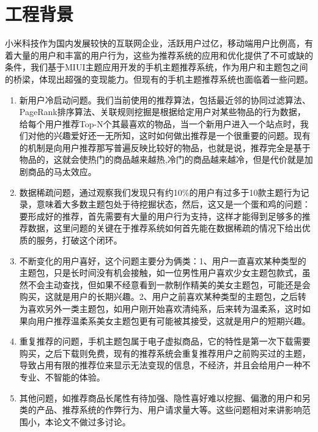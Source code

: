 \section{工程背景}
	小米科技作为国内发展较快的互联网企业，活跃用户过亿，移动端用户比例高，有着大量的用户和丰富的用户行为，这些为推荐系统的应用和优化提供了不可或缺的条件，我们基于MIUI主题应用开发的手机主题推荐系统，作为用户和主题包之间的桥梁，体现出超强的变现能力。但现有的手机主题推荐系统也面临着一些问题。
	\begin{enumerate}[(1)]
	\item 新用户冷启动问题。我们当前使用的推荐算法，包括最近邻的协同过滤算法、PageRank排序算法、关联规则挖掘是根据给定用户对某些物品的行为数据，给每个用户推荐Top-N个其最喜欢的物品，当一个新用户进入一个站点时，我们对他的兴趣爱好还一无所知，这时如何做出推荐是一个很重要的问题。现有的机制是向用户推荐那写普遍反映比较好的物品，也就是说，推荐完全是基于物品的，这就会使热门的商品越来越热,冷门的商品越来越冷，但是代价就是加剧商品的马太效应。

	\item 数据稀疏问题，通过观察我们发现只有约10\%的用户有过多于10款主题行为记录，意味着大多数主题包处于待挖掘状态，然后，这又是一个蛋和鸡的问题：要形成好的推荐，首先需要有大量的用户行为支持，这样才能得到足够多的推荐数据，这里问题的关键在于推荐系统如何首先能在数据稀疏的情况下给出优质的服务，打破这个闭环。

	\item 不断变化的用户喜好，这个问题主要分为俩类：1、用户一直喜欢某种类型的主题包，只是长时间没有机会接触，如一位男性用户喜欢少女主题包款式，虽然不会主动查找，但如果不经意看到一款制作精美的美女主题包，可能还是会购买，这就是用户的长期兴趣。2、用户之前喜欢某种类型的主题包，之后转为喜欢另外一类主题包，如用户刚开始喜欢清纯系，后来转为温柔系，这时如果向用户推荐温柔系美女主题包更有可能被其接受，这就是用户的短期兴趣。

	\item 重复推荐的问题，手机主题包属于电子虚拟商品，它的特性是第一次下载需要购买，之后下载则免费，现有的推荐系统会重复推荐用户之前购买过的主题，导致占用有限的推荐位来显示无法变现的信息，不经济，并且会给用户一种不专业、不智能的体验。

	\item 其他问题，如推荐商品长尾性有待加强、隐性喜好难以挖掘、偏激的用户和另类的产品、推荐系统的作弊行为、用户请求量大等。这些问题相对来讲影响范围小，本论文不做过多讨论。
	\end{enumerate}

